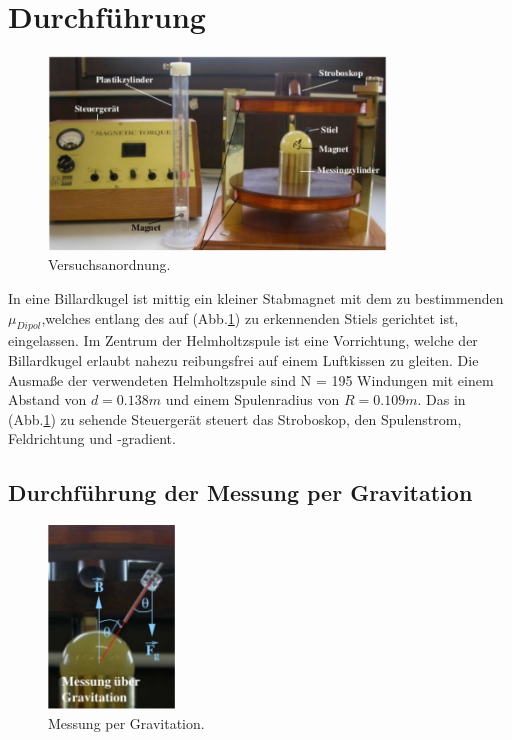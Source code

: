 \newpage

\section{Durchführung}
\label{sec:Durchführung}

\begin{figure}
  \centering
  \includegraphics[width=0.8\textwidth]{content/images/Bild1.pdf}
  \caption{Versuchsanordnung.}
  \label{fig:1}
\end{figure}

In eine Billardkugel ist mittig ein kleiner Stabmagnet mit
dem zu bestimmenden $\mu_{Dipol}$,welches entlang
des auf (Abb.\ref{fig:1}) zu erkennenden Stiels
gerichtet ist, eingelassen. Im Zentrum der Helmholtzspule
ist eine Vorrichtung, welche der Billardkugel erlaubt nahezu
reibungsfrei auf einem Luftkissen zu gleiten.
Die Ausmaße der verwendeten Helmholtzspule sind N = 195 Windungen mit
einem Abstand von $d = 0.138m$ und einem Spulenradius von $R = 0.109m$.
Das in (Abb.\ref{fig:1}) zu sehende Steuergerät steuert das Stroboskop, den Spulenstrom,
 Feldrichtung und -gradient.


 \subsection{Durchführung der Messung per Gravitation}
 \label{ssec:DurchGrav}

 \begin{figure}
   \centering
   \includegraphics[width=0.3\textwidth]{content/images/Bild3.pdf}
   \caption{Messung per Gravitation.}
   \label{fig:2}
 \end{figure}

